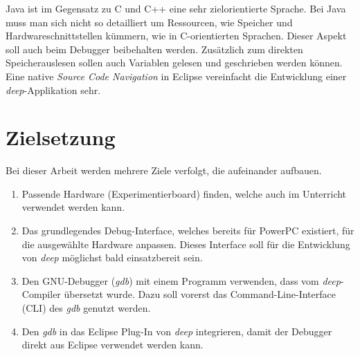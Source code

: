 Java ist im Gegensatz zu C und C++ eine sehr zielorientierte Sprache.
Bei Java muss man sich nicht so detailliert um Ressourcen, wie Speicher und Hardwareschnittstellen kümmern, wie in C-orientierten Sprachen.
Dieser Aspekt soll auch beim Debugger beibehalten werden.
Zusätzlich zum direkten Speicherauslesen sollen auch Variablen gelesen und geschrieben werden können.
Eine native \textit{Source Code Navigation} in Eclipse vereinfacht die Entwicklung einer \textit{deep}-Applikation sehr.



\section{Zielsetzung}
Bei dieser Arbeit werden mehrere Ziele verfolgt, die aufeinander aufbauen.


\begin{enumerate}
\item Passende Hardware (Experimentierboard) finden, welche auch im Unterricht verwendet werden kann.
\item Das grundlegendes Debug-Interface, welches bereits für PowerPC existiert, für die ausgewählte Hardware anpassen. Dieses Interface soll für die Entwicklung von \textit{deep} möglichst bald einsatzbereit sein.
\item Den GNU-Debugger (\textit{gdb}) mit einem Programm verwenden, dass vom \textit{deep}-Compiler übersetzt wurde. Dazu soll vorerst das Command-Line-Interface (CLI) des \textit{gdb} genutzt werden.
\item Den \textit{gdb} in das Eclipse Plug-In von \textit{deep} integrieren, damit der Debugger direkt aus Eclipse verwendet werden kann.
\end{enumerate}









